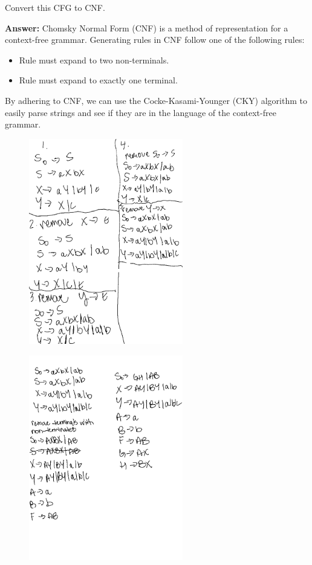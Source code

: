 \documentclass[12pt]{article}
\begin{document}
Convert this CFG to CNF.

\textbf{Answer:} Chomsky Normal Form (CNF) is a method of representation for a
context-free grammar. Generating rules in CNF follow one of the following rules:

\begin{itemize}
      \item Rule must expand to two non-terminals.
      \item Rule must expand to exactly one terminal.
\end{itemize}

By adhering to CNF, we can use the Cocke-Kasami-Younger (CKY) algorithm to
easily parse strings and see if they are in the language of the context-free
grammar.

\begin{figure}[!ht]
      \centering
      \includegraphics[width=0.6\textwidth]{assets/test2/p9a.png}
\end{figure}
\newpage

\begin{figure}[!ht]
      \centering
      \includegraphics[width=0.6\textwidth]{assets/test2/p9b.png}
\end{figure}
\end{document}
